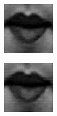 \begin{figure}%
	\centering
	\begin{subfigure}[b]{0.15\textwidth}
		\includegraphics[width=\textwidth]{./img/timeseriesHappy/S026_006_00000001_conew1.png}
		\caption{}
		\label{fig:timeseriesHappy:a}
	\end{subfigure}
	\begin{subfigure}[b]{0.15\textwidth}
		\includegraphics[width=\textwidth]{./img/timeseriesHappy/S026_006_00000002_conew1.png}

\end{subfigure}
\end{figure}
